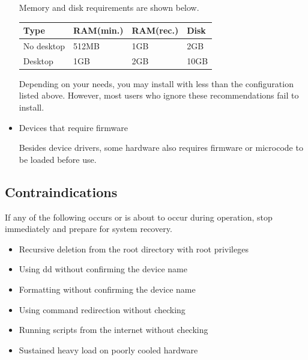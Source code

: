 \documentclass{article}
\begin{document}
\begin{multicols*}{3}
\begin{itemize}[leftmargin=*]
		Memory and disk requirements are shown below.

		{\small\begin{tabularx}{\linewidth}{|X|X|X|X|}
			\hline
			Type & RAM\newline (min.) & RAM\newline (rec.) & Disk \\
			\hline
			No desktop & 512MB & 1GB & 2GB \\
			\hline
			Desktop & 1GB & 2GB & 10GB \\
			\hline
		\end{tabularx}}

		Depending on your needs, you may install with less than the configuration listed above. However, most users who ignore these recommendations fail to install.

		\item Devices that require firmware

		Besides device drivers, some hardware also requires firmware or microcode to be loaded before use.

	\end{itemize}


	\begin{tcolorbox}
	\section*{Contraindications}
	\end{tcolorbox}

	If any of the following occurs or is about to occur during operation, stop immediately and prepare for system recovery.

	\begin{itemize}[leftmargin=*]
		\setlength{\itemsep}{0pt}
		\setlength{\parskip}{0pt}
		\setlength{\parsep}{0pt}

		\item Recursive deletion from the root directory with root privileges
		\item Using dd without confirming the device name
		\item Formatting without confirming the device name
		\item Using command redirection without checking
		\item Running scripts from the internet without checking
		\item Sustained heavy load on poorly cooled hardware
	\end{itemize}


	\begin{tcolorbox}

\end{tcolorbox}
\end{multicols*}
\end{document}
